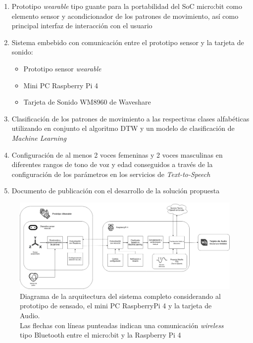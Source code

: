 \begin{enumerate}
	\item Prototipo \textit{wearable} tipo guante para la portabilidad del SoC micro:bit como elemento sensor y acondicionador de los patrones de movimiento, así como principal interfaz de interacción con el usuario
	
	\item Sistema embebido con comunicación entre el prototipo sensor y la tarjeta de sonido:
	\begin{itemize}
		\item Prototipo sensor \textit{wearable}
		\item Mini PC Raspberry Pi 4
		\item Tarjeta de Sonido WM8960 de Waveshare
	\end{itemize}
	
	\item Clasificación de los patrones de movimiento a las respectivas clases alfabéticas utilizando en conjunto el algoritmo DTW y un modelo de clasificación de \textit{Machine Learning}
	
	\item Configuración de al menos 2 voces femeninas y 2 voces masculinas en diferentes rangos de tono de voz y edad conseguidos a través de la configuración de los parámetros en los servicios de \textit{Text-to-Speech}
	
	\item Documento de publicación con el desarrollo de la solución propuesta
\end{enumerate}

\begin{figure}[!h]
	\centering
	\includegraphics[width=15.8cm]{Imagenes/Diagrama_Arquitectura.png}
	\caption{Diagrama de la arquitectura del sistema completo considerando al prototipo de sensado, el mini PC RaspberryPi 4 y la tarjeta de Audio.\\ Las flechas con líneas punteadas indican una comunicación \textit{wireless} tipo Bluetooth entre el micro:bit y la Raspberry Pi 4}
	\label{Arquitectura}
\end{figure}